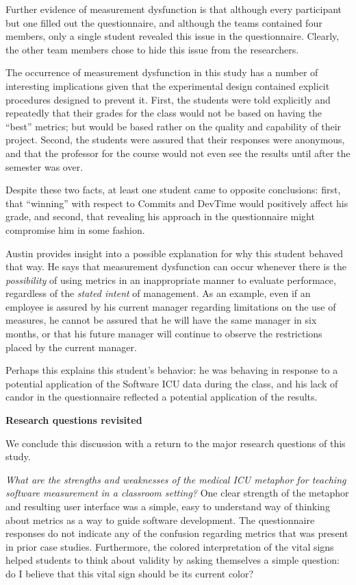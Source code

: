 \documentclass{acm_proc_article-sp}
\begin{document}
Further evidence of measurement dysfunction is that although every
participant but one filled out the questionnaire, and although the teams
contained four members, only a single student revealed this issue in the
questionnaire. Clearly, the other team members chose to hide this issue
from the researchers.

The occurrence of measurement dysfunction in this study has a number of
interesting implications given that the experimental design contained
explicit procedures designed to prevent it.  First, the students were told
explicitly and repeatedly that their grades for the class would not be
based on having the ``best'' metrics; but would be based rather on the
quality and capability of their project.  Second, the students were assured
that their responses were anonymous, and that the professor for the course
would not even see the results until after the semester was over.

Despite these two facts, at least one student came to opposite conclusions:
first, that ``winning'' with respect to Commits and DevTime would
positively affect his grade, and second, that revealing his approach in the
questionnaire might compromise him in some fashion.

Austin provides insight into a possible explanation for why this student
behaved that way.  He says that measurement dysfunction can occur whenever
there is the {\em possibility} of using metrics in an inappropriate manner
to evaluate performace, regardless of the {\em stated intent} of
management.  As an example, even if an employee is assured by his current
manager regarding limitations on the use of measures, he cannot be assured
that he will have the same manager in six months, or that his future
manager will continue to observe the restrictions placed by the current
manager.

Perhaps this explains this student's behavior: he was behaving in response
to a potential application of the Software ICU data during the class, and
his lack of candor in the questionnaire reflected a potential application
of the results.

{\bf Research questions revisited}

We conclude this discussion with a return to the major research questions of this study. 

{\em What are the strengths and weaknesses of the medical ICU metaphor
for teaching software measurement in a classroom setting?}  One clear
strength of the metaphor and resulting user interface was a simple, easy to
understand way of thinking about metrics as a way to guide software
development.  The questionnaire responses do not indicate any of the
confusion regarding metrics that was present in prior case studies.
Furthermore, the colored interpretation of the vital signs helped students
to think about validity by asking themselves a simple question: do I believe
that this vital sign should be its current color?
\end{document}

